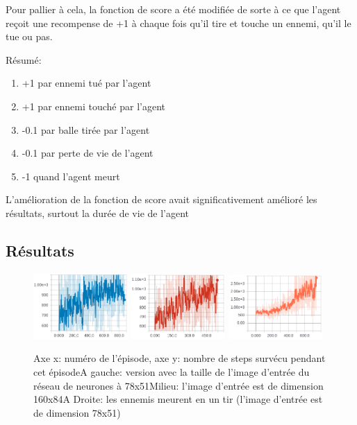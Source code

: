 \documentclass[a4paper,10pt,openany,oneside]{report}
\begin{document}
Pour pallier à cela, la fonction de score a été modifiée de sorte à ce que l'agent reçoit une recompense de +1 à chaque fois qu'il tire et touche un ennemi, qu'il le tue ou pas.

Résumé:
\begin{enumerate}
\item +1 par ennemi tué par l'agent
\item +1 par ennemi touché par l'agent
\item -0.1 par balle tirée par l'agent
\item -0.1 par perte de vie de l'agent
\item -1 quand l'agent meurt
\end{enumerate}
L'amélioration de la fonction de score avait significativement amélioré les résultats, surtout la durée de vie de l'agent
\subsection{Résultats}
\begin{figure}[H]
	\centering
	\includegraphics[width=0.32\textwidth]{img/doom_78x51.png}
	\includegraphics[width=0.32\textwidth]{img/doom_160x84.png}
	\includegraphics[width=0.32\textwidth]{img/doom_oneshotkill.png}
	\caption{Axe x: numéro de l'épisode, axe y: nombre de steps survécu pendant cet épisode\hspace{\textwidth}A gauche: version avec la taille de l'image d'entrée du réseau de neurones à 78x51\hspace{\textwidth}Milieu: l'image d'entrée est de dimension 160x84\hspace{\textwidth}A Droite: les ennemis meurent en un tir (l'image d'entrée est de dimension 78x51)}
\end{figure}
\end{document}
